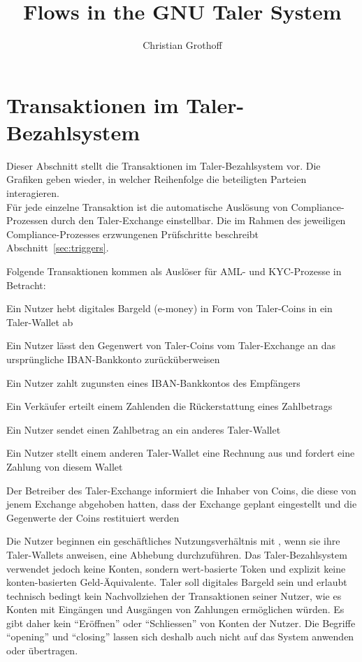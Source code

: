 \documentclass[10pt,a4paper,oneside]{book}
\author{Christian Grothoff}
\title{Flows in the GNU Taler System}
\begin{document}
\tableofcontents



\section{Transaktionen im Taler-Bezahlsystem}\label{sec:Transaktionen}

Dieser Abschnitt stellt die Transaktionen im Taler-Bezahlsystem
vor. Die Grafiken geben wieder, in welcher Reihenfolge die beteiligten
Parteien interagieren. \\
F\"ur jede einzelne Transaktion ist die automatische Ausl\"osung von
Compliance-Prozessen durch den Taler-Exchange einstellbar.
Die im Rahmen des jeweiligen Compliance-Prozesses erzwungenen
Pr\"ufschritte beschreibt Abschnitt~\ref{sec:triggers}.

Folgende Transaktionen kommen als Ausl\"oser f\"ur AML- und KYC-Prozesse
in Betracht:
\begin{description}[noitemsep]
  \item[withdraw] Ein Nutzer hebt digitales Bargeld (e-money) in Form von
  Taler-Coins in ein Taler-Wallet ab
  \item[reimburse] Ein Nutzer l\"asst den Gegenwert von Taler-Coins vom
  Taler-Exchange an das urspr\"ungliche IBAN-Bankkonto zur\"uck\"uberweisen
  \item[pay] Ein Nutzer zahlt zugunsten eines IBAN-Bankkontos des Empf\"angers
  \item[refund] Ein Verk\"aufer erteilt einem Zahlenden die R\"uckerstattung
  eines Zahlbetrags
  \item[push] Ein Nutzer sendet einen Zahlbetrag an ein anderes Taler-Wallet
  \item[pull] Ein Nutzer stellt einem anderen Taler-Wallet eine Rechnung aus
  und fordert eine Zahlung von diesem Wallet
  \item[shutdown] Der Betreiber des Taler-Exchange informiert die Inhaber von
  Coins, die diese von jenem Exchange abgehoben hatten, dass der Exchange
  geplant eingestellt und die Gegenwerte der Coins restituiert werden
\end{description}

Die Nutzer beginnen ein gesch\"aftliches Nutzungsverh\"altnis mit
\TALER{}, wenn sie ihre Taler-Wallets anweisen, eine Abhebung durchzuf\"uhren.
Das Taler-Bezahlsystem verwendet jedoch keine Konten, sondern wert-basierte
Token und explizit keine konten-basierten Geld-\"Aquivalente.
Taler soll digitales Bargeld sein und erlaubt technisch bedingt
kein Nachvollziehen der Transaktionen seiner Nutzer, wie es Konten mit
Eing\"angen und Ausg\"angen von Zahlungen erm\"oglichen w\"urden.
Es gibt daher kein ``Er\"offnen'' oder ``Schliessen'' von Konten der Nutzer.
Die Begriffe ``opening'' und ``closing'' lassen sich deshalb auch nicht auf
das System anwenden oder \"ubertragen. \\
\end{document}
